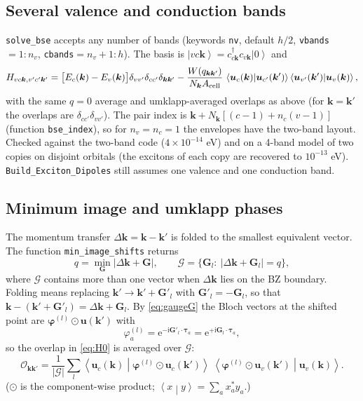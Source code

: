 \documentclass[11pt,a4paper]{article}
\newcommand{\ii}{\mathrm{i}}
\newcommand{\ee}{\mathrm{e}}
\newcommand{\kk}{\bm{k}}
\newcommand{\GG}{\bm{G}}
\newcommand{\ttau}{\bm{\tau}}
\newcommand{\ket}[1]{\left|#1\right\rangle}
\newcommand{\braket}[2]{\left\langle#1\middle|#2\right\rangle}
\newcommand{\code}[1]{\texttt{#1}}
\newcommand{\Acell}{A_{\rm cell}}
\newcommand{\Nk}{N_{\bm k}}
\begin{document}
\subsection{Several valence and conduction bands}
\code{solve\_bse} accepts any number of bands (keywords \code{nv}, default $h/2$, \code{vbands}$=1{:}n_v$, \code{cbands}$=n_v{+}1{:}h$). The basis is
$\ket{vc\kk}=c^\dagger_{c\kk}c_{v\kk}\ket0$ and
\begin{equation}
H_{vc\kk,v'c'\kk'}=\big[E_c(\kk)-E_v(\kk)\big]\delta_{vv'}\delta_{cc'}\delta_{\kk\kk'}
-\frac{W(q_{\kk\kk'})}{\Nk\Acell}\,\braket{\bm u_c(\kk)}{\bm u_{c'}(\kk')}\braket{\bm u_{v'}(\kk')}{\bm u_v(\kk)},
\end{equation}
with the same $q=0$ average and umklapp-averaged overlaps as above (for $\kk=\kk'$ the overlaps are $\delta_{cc'}\delta_{vv'}$). The pair index is
$\kk+\Nk[(c-1)+n_c(v-1)]$ (function \code{bse\_index}), so for $n_v=n_c=1$ the envelopes have the two-band layout. Checked against the two-band
code ($4\times10^{-14}$ eV) and on a 4-band model of two copies on disjoint orbitals (the excitons of each copy are recovered to $10^{-13}$ eV).
\code{Build\_Exciton\_Dipoles} still assumes one valence and one conduction band.

\subsection{Minimum image and umklapp phases}
The momentum transfer $\Delta\kk=\kk-\kk'$ is folded to the smallest equivalent vector. The function \code{min\_image\_shifts} returns
\begin{equation}
q=\min_{\GG}|\Delta\kk+\GG|,\qquad \mathcal G=\{\GG_l:\ |\Delta\kk+\GG_l|=q\},
\label{eq:minimg}
\end{equation}
where $\mathcal G$ contains more than one vector when $\Delta\kk$ lies on the BZ boundary. Folding means replacing $\kk'\to\kk'+\bm G'_l$ with $\bm G'_l=-\GG_l$, so that $\kk-(\kk'+\bm G'_l)=\Delta\kk+\GG_l$. By \eqref{eq:gaugeG} the Bloch vectors at the shifted point are $\bm\varphi^{(l)}\odot\bm u(\kk')$ with
\begin{equation}
\varphi^{(l)}_a=\ee^{-\ii\bm G'_l\cdot\ttau_a}=\ee^{+\ii\GG_l\cdot\ttau_a},
\end{equation}
so the overlap in \eqref{eq:H0} is averaged over $\mathcal G$:
\begin{equation}
\mathcal O_{\kk\kk'}=\frac{1}{|\mathcal G|}\sum_{l}
\braket{\bm u_c(\kk)}{\bm\varphi^{(l)}\!\odot\bm u_c(\kk')}\;
\braket{\bm\varphi^{(l)}\!\odot\bm u_v(\kk')}{\bm u_v(\kk)}.
\label{eq:Oumk}
\end{equation}
($\odot$ is the component-wise product; $\braket{x}{y}=\sum_a x_a^*y_a$.)
\end{document}

